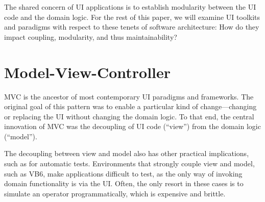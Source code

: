 \documentclass[sigplan,screen]{acmart}
\begin{document}
The shared concern of UI applications is to establish modularity
between the UI code and the domain logic.  For the rest of this paper, we will examine UI toolkits and paradigms
with respect to these tenets of software architecture: How do they
impact coupling, modularity, and thus maintainability?  


\section{Model-View-Controller}
\label{sec:mvc}
  

MVC is the ancestor of most contemporary UI paradigms and frameworks.
The original goal of this pattern was to enable a particular kind of
change---changing or replacing the UI without changing the domain
logic.  To that end, the central innovation of MVC was the decoupling
of UI code (``view'') from the domain logic (``model'').

The decoupling between view and model also has other practical
implications, such as for automatic tests.  Environments that
strongly couple view and model, such as VB6, make applications
difficult to test, as the only way of invoking domain
functionality is via the UI.
Often, the only resort in these cases is to simulate an operator
programmatically, which is expensive and brittle.
\end{document}

